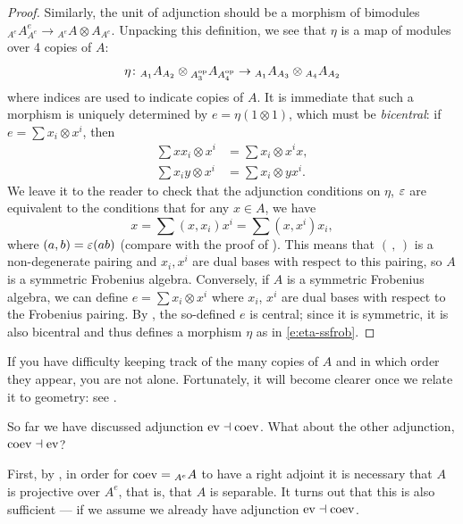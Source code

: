\begin{proof}
  Similarly, the unit of adjunction should be a morphism of bimodules
  ${}_{A^e} A^e_{A^e} \to {}_{A^e}A\otimes A_{A^e}$. Unpacking this definition,
  we see that $\eta$ is a map of modules over 4 copies of $A$:
  \begin{equation}\label{e:eta-ssfrob}
  \eta\colon {}_{A_1} A_{A_2}\otimes {}_{A^{\mathrm{op}}_3}A_{A^{\mathrm{op}}_4}
      \to   {}_{A_1} A_{A_3}\otimes {}_{A_4}A_{A_2}
  \end{equation}
  where indices are used to indicate copies of $A$. It is immediate that such a
  morphism is uniquely determined by $e=\eta(1\otimes 1)$, which must be
  \emph{bicentral}: if $e=\sum x_i\otimes x^i$, then
  \begin{equation}\label{e:bicentral}
     \begin{aligned}
       \sum xx_i\otimes x^i&=\sum x_i\otimes x^ix,\\
       \sum x_iy\otimes x^i&=\sum x_i\otimes yx^i.
     \end{aligned}
   \end{equation}
   We leave it to the reader to check that the adjunction conditions on $\eta$,
   $\varepsilon$ are equivalent to the conditions that for any $x\in A$, we have
   $$
     x= \sum (x, x_i)x^i = \sum (x, x^i) x_i,
   $$
   where $(a,b)=\varepsilon(ab)$ (compare with the proof of ).
   This means that $(\, ,\,)$ is a non-degenerate pairing and $x_i, x^i$
   are dual bases with respect to this pairing, so $A$ is a symmetric Frobenius
   algebra.
   Conversely, if $A$ is a symmetric Frobenius algebra, we can define
   $e=\sum x_i \otimes x^i$ where $x_i$, $x^i$ are dual bases with respect to
   the Frobenius pairing. By , the so-defined $e$ is central;
   since it is symmetric, it is also bicentral and thus defines a morphism
   $\eta$ as in \eqref{e:eta-ssfrob}.

\end{proof}

\begin{remark}
  If you have difficulty keeping track of the many copies of $A$ and in which
  order they appear, you are not alone. Fortunately, it will become clearer
  once we relate it to geometry: see .
\end{remark}


So far we have discussed adjunction $\operatorname{ev}\dashv \operatorname{coev}$. What about the other
adjunction, $\operatorname{coev}\dashv \operatorname{ev}$?

First, by , in order for $\operatorname{coev}={}_{A^e}A$ to have a right
adjoint it is necessary that $A$ is projective over $A^e$, that is, that $A$ is
separable. It turns out that this is also sufficient --- if we assume we
already have adjunction $\operatorname{ev}\dashv\operatorname{coev}$.


